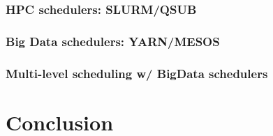 \documentclass{report}
\begin{document}
\subsection{HPC schedulers: SLURM/QSUB} \subsection{Big Data schedulers:
YARN/MESOS} \subsection{Multi-level scheduling w/ BigData schedulers}
\chapter{Conclusion}




\end{document}
